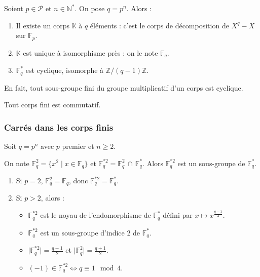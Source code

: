 	\begin{theorem}
		Soient $p \in \mathcal{P}$ et $n \in \mathbb{N}^*$. On pose $q = p^n$. Alors :
		\begin{enumerate}[label=(\roman*)]
			\item Il existe un corps $\mathbb{K}$ à $q$ éléments : c'est le corps de décomposition de $X^q - X$ sur $\mathbb{F}_p$.
			\item $\mathbb{K}$ est unique à isomorphisme près : on le note $\mathbb{F}_q$.
			\item $\mathbb{F}_q^*$ est cyclique, isomorphe à $\mathbb{Z}/(q-1)\mathbb{Z}$.
		\end{enumerate}
	\end{theorem}
	
	\begin{remark}
		En fait, tout sous-groupe fini du groupe multiplicatif d'un corps est cyclique.
	\end{remark}
	
	\reference[GOU21]{100}
	
	\begin{theorem}[Wedderburn]
		Tout corps fini est commutatif.
	\end{theorem}
	
	\subsubsection{Carrés dans les corps finis}
	
	
	Soit $q = p^n$ avec $p$ premier et $n \geq 2$.
	
	\begin{proposition}
		On note $\mathbb{F}_q^2 = \{ x^2 \mid x \in \mathbb{F}_q \}$ et $\mathbb{F}_q^{*2} = \mathbb{F}_q^2 \, \cap \, \mathbb{F}_q^*$. Alors $\mathbb{F}_q^{*2}$ est un sous-groupe de $\mathbb{F}_q^*$.
	\end{proposition}
	
	\begin{proposition}
		\begin{enumerate}[label=(\roman*)]
			\item Si $p = 2$, $\mathbb{F}_q^2 = \mathbb{F}_q$, donc $\mathbb{F}_q^{*2} = \mathbb{F}_q^*$.
			\item Si $p > 2$, alors :
			\begin{itemize}
				\item $\mathbb{F}_q^{*2}$ est le noyau de l'endomorphisme de $\mathbb{F}_q^*$ défini par $x \mapsto x^{\frac{q-1}{2}}$.
				\item $\mathbb{F}_q^{*2}$ est un sous-groupe d'indice $2$ de $\mathbb{F}_q^*$.
				\item $\vert \mathbb{F}_q^{*2} \vert = \frac{q-1}{2}$ et $\vert \mathbb{F}_q^2 \vert = \frac{q+1}{2}$.
				\item $(-1) \in \mathbb{F}_q^{*2} \iff q \equiv 1 \mod 4$.
			\end{itemize}
		\end{enumerate}
	\end{proposition}
	
